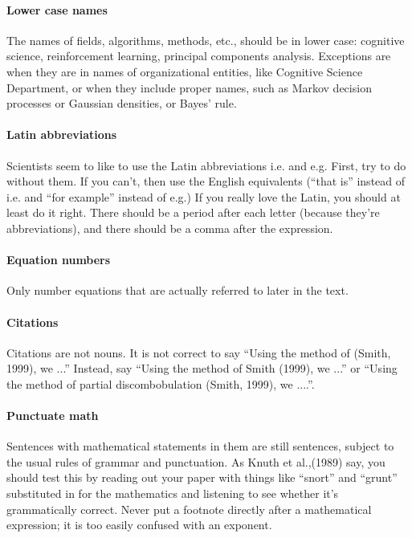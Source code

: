 \documentclass[twoside,11pt]{article}
\begin{document}
\paragraph{Lower case names}
The names of fields, algorithms, methods, etc., should be in lower case: cognitive science, reinforcement learning, principal components analysis. Exceptions are when they are in names of organizational entities, like Cognitive Science Department, or when they include proper names, such as Markov decision processes or Gaussian densities, or Bayes' rule. 

\paragraph{Latin abbreviations}
Scientists seem to like to use the Latin abbreviations i.e. and e.g. First, try to do without them. If you can't, then use the English equivalents (``that is'' instead of i.e. and ``for example'' instead of e.g.) If you really love the Latin, you should at least do it right. There should be a period after each letter (because they're abbreviations), and there should be a comma after the expression.

\paragraph{Equation numbers}
Only number equations that are actually referred to later in the text. 

\paragraph{Citations}
Citations are not nouns. It is not correct to say ``Using the method of (Smith, 1999), we ...'' Instead, say ``Using the method of Smith (1999), we ...'' or ``Using the method of partial discombobulation (Smith, 1999), we ....''. 

\paragraph{Punctuate math}
Sentences with mathematical statements in them are still sentences, subject to the usual rules of grammar and punctuation. As Knuth et al.,(1989) say, you should test this by reading out your paper with things like ``snort'' and ``grunt'' substituted in for the mathematics and listening to see whether it's grammatically correct. Never put a footnote directly after a mathematical expression; it is too easily confused with an exponent. 
\end{document}
